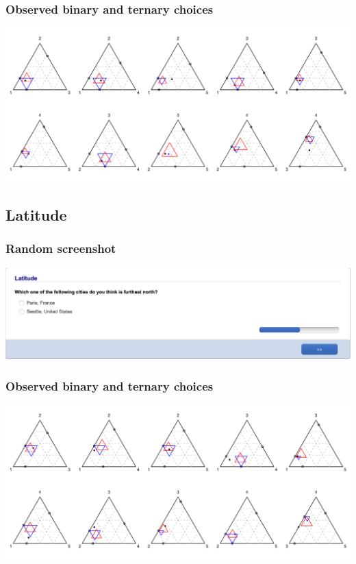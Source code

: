 \documentclass[11pt,letter]{article}
\begin{document}
\subsubsection*{Observed binary and ternary choices}

\includegraphics[width=15cm]{./Population_study_data/Simplexes/Marijuana.pdf}

\pagebreak

\subsection{Latitude}



\subsubsection*{Random screenshot}

\includegraphics[width=15cm]{Population_study_design/screenshot_Latitude.png}

\subsubsection*{Observed binary and ternary choices}

\includegraphics[width=15cm]{./Population_study_data/Simplexes/Latitude.pdf}
\end{document}
